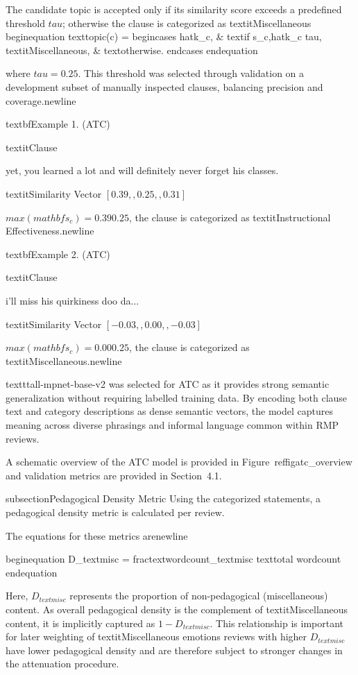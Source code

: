 The candidate topic is accepted only if its similarity score exceeds a predefined threshold $tau$; otherwise the clause is categorized as textit{Miscellaneous}
begin{equation}
text{topic}(c) =
begin{cases}
hat{k}_c, & text{if } s_{c,hat{k}_c}  tau, 
textit{Miscellaneous}, & text{otherwise}.
end{cases}
end{equation}

where $tau = 0.25$. This threshold was selected through validation on a development subset of manually inspected clauses, balancing precision and coverage.newline


textbf{Example 1. (ATC)}

textit{Clause}

yet, you learned a lot and will definitely never forget his classes.

textit{Similarity Vector} $[0.39,,0.25,,0.31]$

$max(mathbf{s}_c) = 0.39  0.25$, the clause is categorized as textit{Instructional Effectiveness}.newline

textbf{Example 2. (ATC)}

textit{Clause}

i'll miss his quirkiness doo da...

textit{Similarity Vector} $[-0.03,,0.00,,-0.03]$

$max(mathbf{s}_c) = 0.00  0.25$, the clause is categorized as textit{Miscellaneous}.newline

texttt{all-mpnet-base-v2} was selected for ATC as it provides strong semantic generalization without requiring labelled training data. By encoding both clause text and category descriptions as dense semantic vectors, the model captures meaning across diverse phrasings and informal language common within RMP reviews. 

A schematic overview of the ATC model is provided in Figure~ref{figatc_overview} and validation metrics are provided in Section~4.1.

subsection{Pedagogical Density Metric} 
Using the categorized statements, a pedagogical density metric is calculated per review.

The equations for these metrics arenewline

begin{equation}
D_{text{misc}} =
frac{text{wordcount}_{text{misc}}}
{text{total wordcount}}
end{equation}

Here, $D_{text{misc}}$ represents the proportion of non-pedagogical (miscellaneous) content. As overall pedagogical density is the complement of textit{Miscellaneous} content, it is implicitly captured as $1 - D_{text{misc}}$. This relationship is important for later weighting of textit{Miscellaneous} emotions reviews with higher $D_{text{misc}}$ have lower pedagogical density and are therefore subject to stronger changes in the attenuation procedure.


